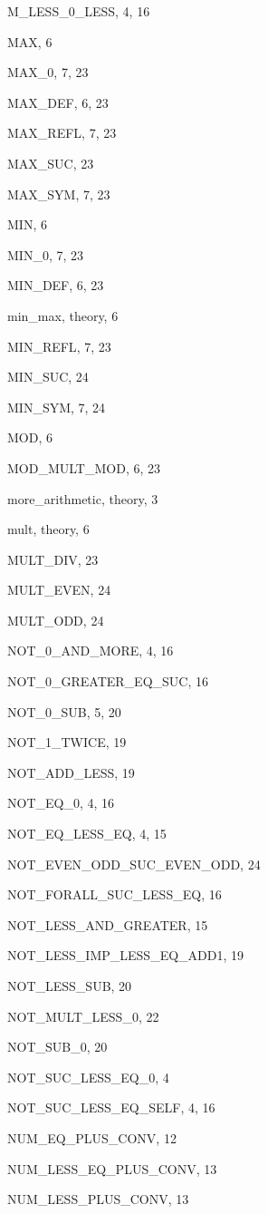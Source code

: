 \begin{theindex}
  \indexspace

  \item {\ptt M\_LESS\_0\_LESS}, 4, 16
  \item {\ptt MAX}, 6
  \item {\ptt MAX\_0}, 7, 23
  \item {\ptt MAX\_DEF}, 6, 23
  \item {\ptt MAX\_REFL}, 7, 23
  \item {\ptt MAX\_SUC}, 23
  \item {\ptt MAX\_SYM}, 7, 23
  \item {\ptt MIN}, 6
  \item {\ptt MIN\_0}, 7, 23
  \item {\ptt MIN\_DEF}, 6, 23
  \item {\ptt min\_max}, theory, 6
  \item {\ptt MIN\_REFL}, 7, 23
  \item {\ptt MIN\_SUC}, 24
  \item {\ptt MIN\_SYM}, 7, 24
  \item {\ptt MOD}, 6
  \item {\ptt MOD\_MULT\_MOD}, 6, 23
  \item {\ptt more\_arithmetic}, theory, 3
  \item {\ptt mult}, theory, 6
  \item {\ptt MULT\_DIV}, 23
  \item {\ptt MULT\_EVEN}, 24
  \item {\ptt MULT\_ODD}, 24

  \indexspace

  \item {\ptt NOT\_0\_AND\_MORE}, 4, 16
  \item {\ptt NOT\_0\_GREATER\_EQ\_SUC}, 16
  \item {\ptt NOT\_0\_SUB}, 5, 20
  \item {\ptt NOT\_1\_TWICE}, 19
  \item {\ptt NOT\_ADD\_LESS}, 19
  \item {\ptt NOT\_EQ\_0}, 4, 16
  \item {\ptt NOT\_EQ\_LESS\_EQ}, 4, 15
  \item {\ptt NOT\_EVEN\_ODD\_SUC\_EVEN\_ODD}, 24
  \item {\ptt NOT\_FORALL\_SUC\_LESS\_EQ}, 16
  \item {\ptt NOT\_LESS\_AND\_GREATER}, 15
  \item {\ptt NOT\_LESS\_IMP\_LESS\_EQ\_ADD1}, 19
  \item {\ptt NOT\_LESS\_SUB}, 20
  \item {\ptt NOT\_MULT\_LESS\_0}, 22
  \item {\ptt NOT\_SUB\_0}, 20
  \item {\ptt NOT\_SUC\_LESS\_EQ\_0}, 4
  \item {\ptt NOT\_SUC\_LESS\_EQ\_SELF}, 4, 16
  \item {\ptt NUM\_EQ\_PLUS\_CONV}, 12
  \item {\ptt NUM\_LESS\_EQ\_PLUS\_CONV}, 13
  \item {\ptt NUM\_LESS\_PLUS\_CONV}, 13


\end{theindex}
